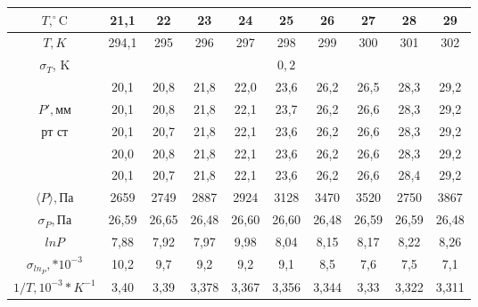 \documentclass[a4paper,12pt]{article} %
\begin{document}
\begin{tabular}{|c|c|c|c|c|c|c|c|c|c|}
\hline 
$T, ^\circ \text{C}$ & 21,1 & 22 & 23 & 24 & 25 & 26 & 27 & 28 & 29 \\ 
\hline 
$T, K$ & 294,1 & 295 & 296 & 297 & 298 & 299 & 300 & 301 & 302 \\ 
\hline 
$\sigma_T$, K & \multicolumn{9}{c|}{$0,2$} \\ 
\hline 
 & 20,1 & 20,8 & 21,8 & 22,0 & 23,6 & 26,2 & 26,5 & 28,3 & 29,2 \\ 
\hhline{~---------} 
$P', \text{мм}$ & 20,1 & 20,8 & 21,8 & 22,1 & 23,7 & 26,2 & 26,6 & 28,3 & 29,2 \\ 
\hhline{~---------}  
$\text{рт ст}$ & 20,1 & 20,7 & 21,8 & 22,1 & 23,6 & 26,2 & 26,6 & 28,3 & 29,2 \\ 
\hhline{~---------} 
 & 20,0 & 20,8 & 21,8 & 22,1 & 23,6 & 26,2 & 26,6 & 28,3 & 29,2 \\ 
\hhline{~---------} 
 & 20,1 & 20,7 & 21,8 & 22,1 & 23,6 & 26,2 & 26,6 & 28,4 & 29,2 \\ 
\hline 
$\langle P \rangle, \text{Па} $ & 2659 & 2749 & 2887 & 2924 & 3128 & 3470 & 3520 & 2750 & 3867 \\ 
\hline 
$\sigma_P, \text{Па}$ & 26,59 & 26,65 & 26,48 & 26,60 & 26,60 & 26,48 & 26,59 & 26,59 & 26,48 \\ 
\hline 
$ln{P}$ & 7,88 & 7,92 & 7,97 & 9,98 & 8,04 & 8,15 & 8,17 & 8,22 & 8,26 \\ 
\hline 
$\sigma_{ln_P}, *10^{-3}$ & 10,2 & 9,7 & 9,2 & 9,2 & 9,1 & 8,5 & 7,6 & 7,5 & 7,1 \\ 
\hline 
$1/T, 10^{-3}*K^{-1}$ & 3,40 & 3,39 & 3,378 & 3,367 & 3,356 & 3,344 & 3,33 & 3,322 & 3,311 \\ 
\hline 
\end{tabular} 

\medskip
\medskip
\end{document}
